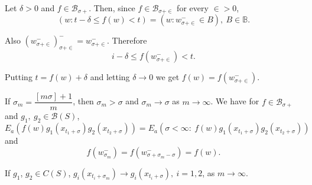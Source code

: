 Let $\delta > 0$ and $f \in \mathscr{B}_{\sigma +}$. Then, since $f
\in \mathscr{B}_{\sigma + \in}$ for every $\in > 0$, 
$$
( w : t - \delta \leq f (w) < t ) = ( w : w^-_{\sigma + \in} \in B), ~
B \in \mathbb{B}. 
$$

Also $( w^-_{\sigma + \in})^-_{\sigma + \in} = w^-_{\sigma + \in}$. Therefore
$$
i - \delta \leq f (w^-_{\sigma + \in} )< t .
$$\pageoriginale

Putting  $t = f (w) + \delta$ and letting $\delta \to 0$ we get $f (w)
= f (w^-_{\sigma + \in})$.  

If $\sigma_m = \dfrac{[ m \sigma ] +1}{m} $, then $\sigma_m > \sigma$
and $\sigma_m \to \sigma$ as $m \to \infty$. We have for $f \in
\mathscr{B}_{\sigma +}$ and $g_1,~ g_2 \in \mathscr{B} (S) $,  
$$
E_a (f (w) g_1 (x_{t_{1}+ \sigma}) g_2 (x_{t_{2} + \sigma})) = E_a (
  \sigma < \infty : ~ f (w) g_1 (x_{t_{1} + \sigma}) g_2 (x_{t_{2} +
    \sigma} ))
$$
and
$$
f (w^-_{\sigma_{m}} ) = f (w^-_{\sigma + \sigma_m - \sigma} ) = f
(w).
$$

If $g_1$, $g_2 \in C(S)$, $g_i (x_{t_{i}+ \sigma_m}) \to g_i (x_{t_{i} +
  \sigma}), ~ i = 1,2$, as  $m \to \infty$. 

